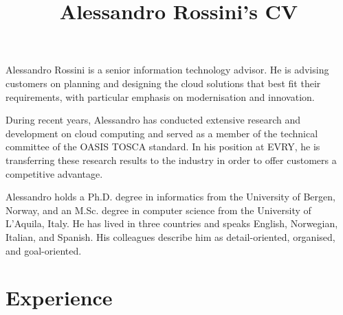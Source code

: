\documentclass[a4paper,online]{adcv}
\title{Alessandro Rossini's CV}
\begin{document}

Alessandro Rossini is a senior information technology advisor. He is advising customers on planning and designing the cloud solutions that best fit their requirements, with particular emphasis on modernisation and innovation.

During recent years, Alessandro has conducted extensive research and development on cloud computing and served as a member of the technical committee of the OASIS TOSCA standard. In his position at EVRY, he is transferring these research results to the industry in order to offer customers a competitive advantage.

Alessandro holds a Ph.D. degree in informatics from the University of Bergen, Norway, and an M.Sc. degree in computer science from the University of L'Aquila, Italy. He has lived in three countries and speaks English, Norwegian, Italian, and Spanish. His colleagues describe him as detail-oriented, organised, and goal-oriented.

\section{Experience}
\end{document}
